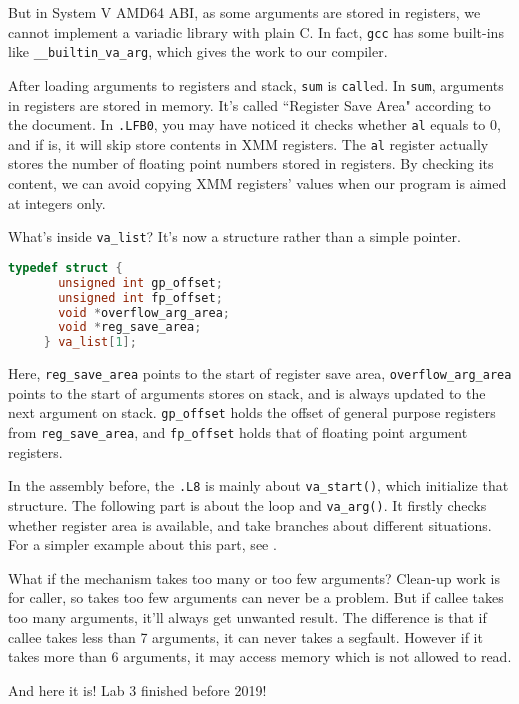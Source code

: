 \documentclass{article}
\begin{document}
	But in System V AMD64 ABI, as some arguments are stored in registers, we cannot implement a variadic library with plain C. In fact, \texttt{gcc} has some built-ins like \texttt{\_\_builtin\_va\_arg}, which gives the work to our compiler.
	
	After loading arguments to registers and stack, \texttt{sum} is \texttt{call}ed. In \texttt{sum}, arguments in registers are stored in memory. It's called ``Register Save Area" according to the document. In \texttt{.LFB0}, you may have noticed it checks whether \texttt{al} equals to 0, and if is, it will skip store contents in XMM registers. The \texttt{al} register actually stores the number of floating point numbers stored in registers. By checking its content, we can avoid copying XMM registers' values when our program is aimed at integers only.
	
	What's inside \texttt{va\_list}? It's now a structure rather than a simple pointer. 
	
	\begin{lstlisting}[language=c, caption={The implementation of \texttt{va\_list} in System V AMD64 ABI}]
	 typedef struct {
	   unsigned int gp_offset;
	   unsigned int fp_offset;
	   void *overflow_arg_area;
	   void *reg_save_area;
	 } va_list[1];
	\end{lstlisting}
	
	Here, \texttt{reg\_save\_area} points to the start of register save area, \texttt{overflow\_arg\_area} points to the start of arguments stores on stack, and is always updated to the next argument on stack. \texttt{gp\_offset} holds the offset of general purpose registers from \texttt{reg\_save\_area}, and \texttt{fp\_offset} holds that of floating point argument registers.
	
	In the assembly before, the \texttt{.L8} is mainly about \texttt{va\_start()}, which initialize that structure. The following part is about the loop and \texttt{va\_arg()}. It firstly checks whether register area is available, and take branches about different situations. For a simpler example about this part, see \cite[Figure 3.35]{amd64-abi}.
	
	What if the mechanism takes too many or too few arguments? Clean-up work is for caller, so takes too few arguments can never be a problem. But if callee takes too many arguments, it'll always get unwanted result. The difference is that if callee takes less than 7 arguments, it can never takes a segfault. However if it takes more than 6 arguments, it may access memory which is not allowed to read.
	
	And here it is! Lab 3 finished before 2019!
	
	
\end{document}
